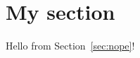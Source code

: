 \documentclass{article}
\begin{document}
\section{My section}
\label{sec:ms}

Hello from Section~\ref{sec:nope}!
\end{document}
